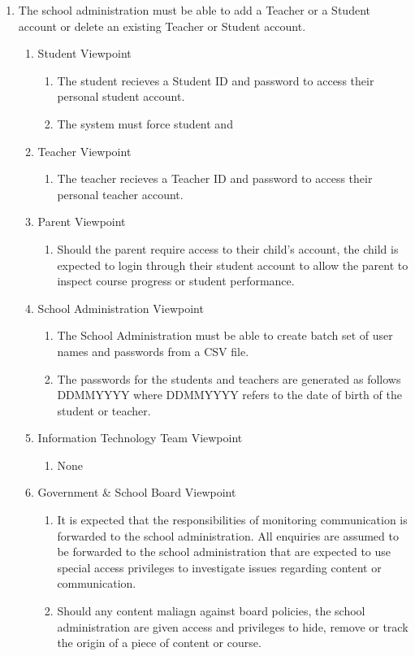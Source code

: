 \documentclass[]{article}
\begin{document}
\begin{enumerate}[{BE}1.]
	\item The school administration must be able to add a Teacher or a Student 
account or delete an existing Teacher or Student account.
	\begin{enumerate}[{VP1}.1]
		\item Student Viewpoint
			\begin{enumerate}
				\item The student recieves a Student ID and password to access their 
personal student account.
				\item The system must force student and
			\end{enumerate}
		\item Teacher Viewpoint
			\begin{enumerate}
				\item The teacher recieves a Teacher ID and password to access their 
personal teacher account.
			\end{enumerate}
		\item Parent Viewpoint
			\begin{enumerate}
				\item Should the parent require access to their child's account, the child 
is expected to login through their student account to allow the parent to 
inspect course progress or student performance.
			\end{enumerate}
		\item School Administration Viewpoint
			\begin{enumerate}
				\item The School Administration must be able to create batch set of user 
names and passwords from a CSV file.
				\item The passwords for the students and teachers are generated as follows 
DDMMYYYY where DDMMYYYY refers to the date of birth of the student or teacher.
			\end{enumerate}
		\item Information Technology Team Viewpoint
			\begin{enumerate}
				\item None
			\end{enumerate}
		\item Government \& School Board Viewpoint
			\begin{enumerate}
				\item It is expected that the responsibilities of monitoring communication 
is forwarded to the school administration. All enquiries are assumed to be 
forwarded to the school administration that are expected to use special access 
privileges to investigate issues regarding content or communication.
				\item Should any content maliagn against board policies, the school 
administration are given access and privileges to hide, remove or track the 
origin of a piece of content or course.
			\end{enumerate}
	\end{enumerate}


\end{enumerate}
\end{document}
